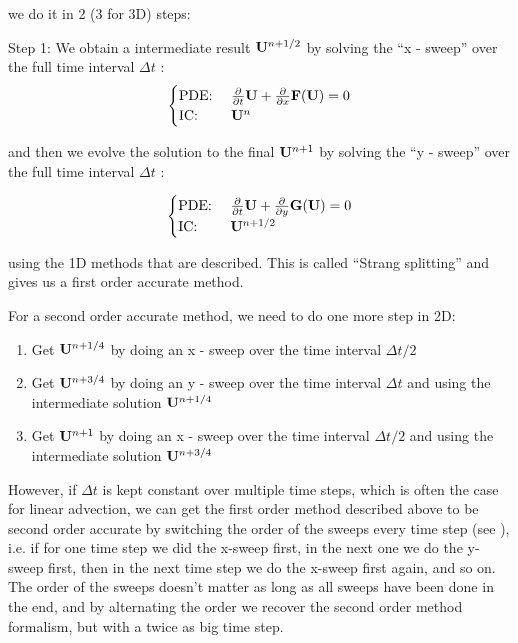 we do it in 2 (3 for 3D) steps:

Step 1: We obtain a intermediate result $\mathbf{U}^{n+1/2}$ by solving the ``x - sweep'' over the full time interval $\Delta t$ :
\begin{equation}
	\begin{cases}
		\text{PDE: } & \frac{\partial}{\partial t}{\mathbf{U}} + \frac{\partial}{\partial x}{\mathbf{F}(\mathbf{U})} = 0\\
		\text{IC: } &  \mathbf{U}^n
	\end{cases}
\end{equation}

and then we evolve the solution to the final $\mathbf{U}^{n+1}$ by solving the ``y - sweep'' over the full time interval $\Delta t$ :

\begin{equation}
	\begin{cases}
		\text{PDE: } & \frac{\partial}{\partial t}{\mathbf{U}} + \frac{\partial}{\partial y} \mathbf{G}(\mathbf{U}) = 0\\
		\text{IC: } & \mathbf{U}^{n+1/2} \\
	\end{cases}
\end{equation}

using the 1D methods that are described.
This is called ``Strang splitting'' and gives us a first order accurate method.

For a second order accurate method, we need to do one more step in 2D:

\begin{enumerate}
	\item Get $\mathbf{U}^{n + 1/4}$ by doing an x - sweep over the time interval $\Delta t / 2$
	\item Get $\mathbf{U}^{n + 3/4}$ by doing an y - sweep over the time interval $\Delta t$ and using the intermediate solution $\mathbf{U}^{n + 1/4}$
	\item Get $\mathbf{U}^{n + 1}$ by doing an x - sweep over the time interval $\Delta t / 2$ and using the intermediate solution $\mathbf{U}^{n + 3/4}$
\end{enumerate}



However, if $\Delta t$ is kept constant over multiple time steps, which is often the case for linear advection, we can get the first order method described above to be second order accurate by switching the order of the sweeps every time step (see \cite{leveque_2002}), i.e.
if for one time step we did the x-sweep first, in the next one we do the y-sweep first, then in the next time step we do the x-sweep first again, and so on.
The order of the sweeps doesn't matter as long as all sweeps have been done in the end, and by alternating the order we recover the second order method formalism, but with a twice as big time step.
















